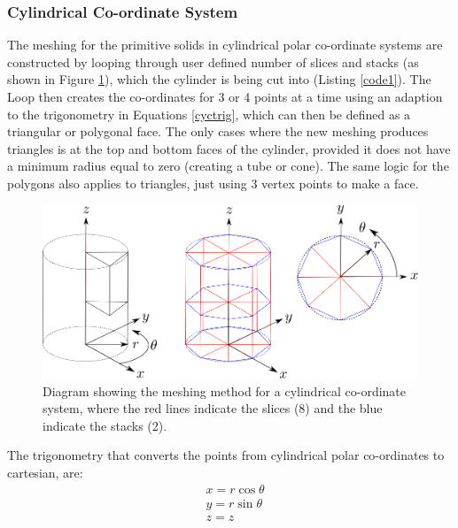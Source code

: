 \documentclass[12pt,a4paper]{article}
\begin{document}
\subsubsection{Cylindrical Co-ordinate System}
\label{cycl}
The meshing for the primitive solids in cylindrical polar co-ordinate systems are constructed by looping through user defined number of slices and stacks (as shown in Figure \ref{cylmeshin}), which the cylinder is being cut into (Listing \ref{code1}). The Loop then creates the co-ordinates for 3 or 4 points at a time using an adaption to the trigonometry in Equations \ref{cyctrig}, which can then be defined as a triangular or polygonal face. The only cases where the new meshing produces triangles is at the top and bottom faces of the cylinder, provided it does not have a minimum radius equal to zero (creating a tube or cone). The same logic for the polygons also applies to triangles, just using 3 vertex points to make a face.

\begin{figure}[h!]
\centering
\includegraphics[scale=0.45]{Images//Coords//cyl.png}
\caption[width=\columnwidth]{Diagram showing the meshing method for a cylindrical co-ordinate system, where the red lines indicate the slices (8) and the blue indicate the stacks (2).}
\label{cylmeshin}
\end{figure}
\vspace{0.3cm}
The trigonometry that converts the points from cylindrical polar co-ordinates to cartesian, are:
\begin{equation}
\begin{aligned}
\label{cyctrig}
& x = r \cos{\theta} \\
& y = r \sin{\theta} \\
& z = z
\end{aligned}
\end{equation}
\end{document}
